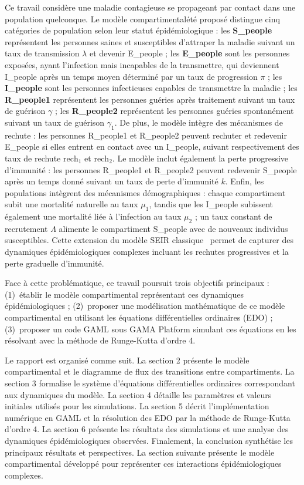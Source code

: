 \documentclass[11pt]{article}
\begin{document}
Ce travail considère une maladie contagieuse se propageant par contact dans une population quelconque. Le modèle compartimentalété proposé distingue cinq catégories de population selon leur statut épidémiologique : les \textbf{S\_people} représentent les personnes saines et susceptibles d'attraper la maladie suivant un taux de transmission $\lambda$ et devenir E\_people ; les \textbf{E\_people} sont les personnes exposées, ayant l'infection mais incapables de la transmettre, qui deviennent I\_people après un temps moyen déterminé par un taux de progression $\pi$ ; les \textbf{I\_people} sont les personnes infectieuses capables de transmettre la maladie ; les \textbf{R\_people1} représentent les personnes guéries après traitement suivant un taux de guérison $\gamma$ ; les \textbf{R\_people2} représentent les personnes guéries spontanément suivant un taux de guérison $\gamma_1$. De plus, le modèle intègre des mécanismes de rechute : les personnes R\_people1 et R\_people2 peuvent rechuter et redevenir E\_people si elles entrent en contact avec un I\_people, suivant respectivement des taux de rechute $\mathrm{rech}_1$ et $\mathrm{rech}_2$. Le modèle inclut également la perte progressive d'immunité : les personnes R\_people1 et R\_people2 peuvent redevenir S\_people après un temps donné suivant un taux de perte d'immunité $k$. Enfin, les populations intègrent des mécanismes démographiques : chaque compartiment subit une mortalité naturelle au taux $\mu_1$, tandis que les I\_people subissent également une mortalité liée à l'infection au taux $\mu_2$ ; un taux constant de recrutement $\Lambda$ alimente le compartiment S\_people avec de nouveaux individus susceptibles. Cette extension du modèle SEIR classique~\cite{hethcote2000} permet de capturer des dynamiques épidémiologiques complexes incluant les rechutes progressives et la perte graduelle d'immunité.

Face à cette problématique, ce travail poursuit trois objectifs principaux : (1)~établir le modèle compartimental représentant ces dynamiques épidémiologiques ; (2)~proposer une modélisation mathématique de ce modèle compartimental en utilisant les équations différentielles ordinaires (EDO) ; (3)~proposer un code GAML sous GAMA Platform simulant ces équations en les résolvant avec la méthode de Runge-Kutta d'ordre 4.

Le rapport est organisé comme suit. La section 2 présente le modèle compartimental et le diagramme de flux des transitions entre compartiments. La section 3 formalise le système d'équations différentielles ordinaires correspondant aux dynamiques du modèle. La section 4 détaille les paramètres et valeurs initiales utilisés pour les simulations. La section 5 décrit l'implémentation numérique en GAML et la résolution des EDO par la méthode de Runge-Kutta d'ordre 4. La section 6 présente les résultats des simulations et une analyse des dynamiques épidémiologiques observées. Finalement, la conclusion synthétise les principaux résultats et perspectives. La section suivante présente le modèle compartimental développé pour représenter ces interactions épidémiologiques complexes.
\end{document}
